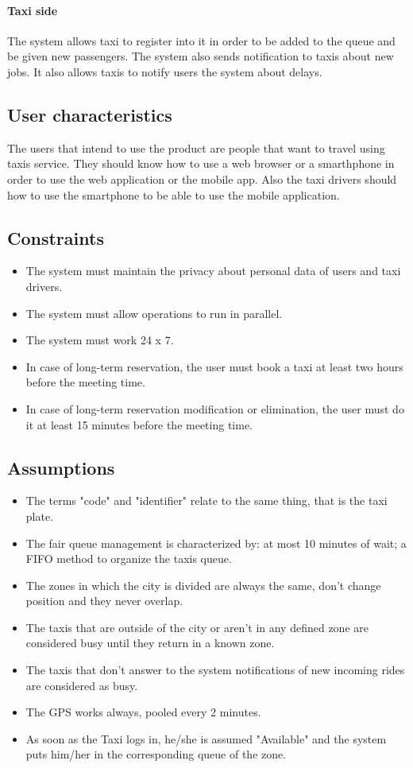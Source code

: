 		\paragraph{Taxi side}The system allows taxi to register into it in order to be added to the queue and be given new passengers. The system also sends notification to taxis about new jobs. It also allows taxis to notify users the system about delays.
	\subsection{User characteristics}
    The users that intend to use the product are people that want to travel using taxis service. They should know how to use a web browser or a smarthphone in order to use the web application or the mobile app. 
    Also the taxi drivers should how to use the smartphone to be able to use the mobile application.
	\subsection{Constraints}
	    \begin{itemize}
	    \item The system must maintain the privacy about personal data of users and taxi drivers.
	    \item The system must allow operations to run in parallel.
	    \item The system must work 24 x 7.
	    \item In case of long-term reservation, the user must book a taxi at least two hours before the meeting time.
	    \item In case of long-term reservation modification or elimination, the user must do it at least 15 minutes before the meeting time.
	    \end{itemize}
	\subsection{Assumptions}
	    \begin{itemize}
	    \item The terms "code" and "identifier" relate to the same thing, that is the taxi plate.
	    \item The fair queue management is characterized by: at most 10 minutes of wait; a FIFO method to organize the taxis queue.
	    \item The zones in which the city is divided are always the same, don't change position and they never overlap.
	    \item The taxis that are outside of the city or aren't in any defined zone are considered busy until they return in a known zone.
	    \item The taxis that don't answer to the system notifications of new incoming rides are considered as busy.
	    \item The GPS works always, pooled every 2 minutes.
	    \item As soon as the Taxi logs in, he/she is assumed "Available" and the system puts him/her in the corresponding queue of the zone.
	    \end{itemize}